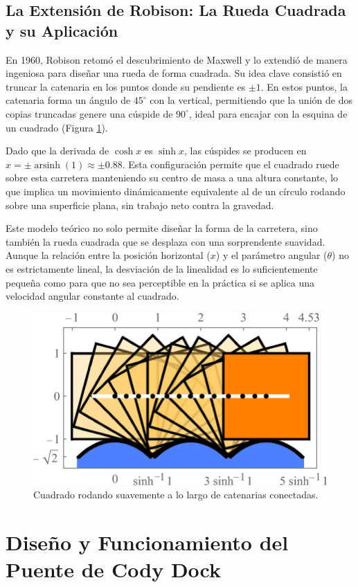 \documentclass{IEEEtran}
\begin{document}
\subsection{La Extensión de Robison: La Rueda Cuadrada y su Aplicación}

En 1960, Robison retomó el descubrimiento de Maxwell y lo extendió de manera ingeniosa para diseñar una rueda de forma cuadrada. Su idea clave consistió en truncar la catenaria en los puntos donde su pendiente es $\pm 1$. En estos puntos, la catenaria forma un ángulo de $45^\circ$ con la vertical, permitiendo que la unión de dos copias truncadas genere una cúspide de $90^\circ$, ideal para encajar con la esquina de un cuadrado (Figura \ref{fig: A square rolls smoothly along linked catenaries}).

Dado que la derivada de $\cosh x$ es $\sinh x$, las cúspides se producen en $x = \pm \operatorname{arsinh}(1) \approx \pm 0.88$. Esta configuración permite que el cuadrado ruede sobre esta carretera manteniendo su centro de masa a una altura constante, lo que implica un movimiento dinámicamente equivalente al de un círculo rodando sobre una superficie plana, sin trabajo neto contra la gravedad.

Este modelo teórico no solo permite diseñar la forma de la carretera, sino también la rueda cuadrada que se desplaza con una sorprendente suavidad. Aunque la relación entre la posición horizontal ($x$) y el parámetro angular ($\theta$) no es estrictamente lineal, la desviación de la linealidad es lo suficientemente pequeña como para que no sea perceptible en la práctica si se aplica una velocidad angular constante al cuadrado.

\begin{figure}[h]
    \centering
    \includegraphics[width = 0.5 \textwidth]{Imagenes/A square rolls smoothly along linked catenaries.png}
    \caption{Cuadrado rodando suavemente a lo largo de catenarias conectadas.}
    \label{fig: A square rolls smoothly along linked catenaries}
\end{figure}

\section{Diseño y Funcionamiento del Puente de Cody Dock}
\end{document}
